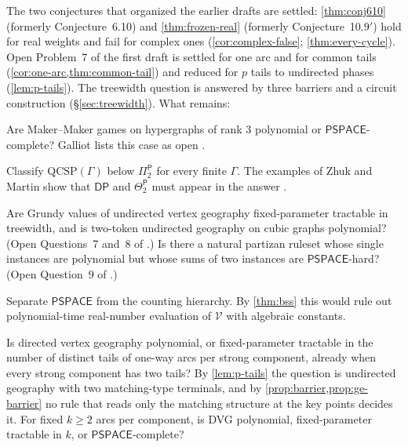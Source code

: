 \documentclass[final]{siamart0516}
\numberwithin{theorem}{section}
\numberwithin{equation}{section}
\theoremstyle{siamnonum}
\theoremstyle{plain}
\newcommand{\val}{\mathcal{V}}            %
\newcommand{\cls}[1]{\mathsf{#1}}
\newcommand{\PSPACE}{\cls{PSPACE}}
\newcommand{\Pclass}{\cls{P}}
\begin{document}
The two conjectures that organized the earlier drafts are settled: \cref{thm:conj610} (formerly Conjecture~6.10) and \cref{thm:frozen-real} (formerly Conjecture~10.9$'$) hold for real weights and fail for complex ones (\cref{cor:complex-false}; \cref{thm:every-cycle}). Open Problem~7 of the first draft is settled for one arc and for common tails (\cref{cor:one-arc,thm:common-tail}) and reduced for $p$ tails to undirected phases (\cref{lem:p-tails}). The treewidth question is answered by three barriers and a circuit construction (\S\ref{sec:treewidth}). What remains:

\begin{problem}\label{prob:makermaker}
Are Maker--Maker games on hypergraphs of rank $3$ polynomial or $\PSPACE$-complete? Galliot lists this case as open \cite{Galliot25}.
\end{problem}

\begin{problem}[below $\Pi_2^{\Pclass}$]\label{prob:qcsp}
Classify $\mathrm{QCSP}(\Gamma)$ below $\Pi_2^{\Pclass}$ for every finite $\Gamma$. The examples of Zhuk and Martin show that $\mathsf{DP}$ and $\Theta_2^{\Pclass}$ must appear in the answer \cite{ZhukMartin}.
\end{problem}

\begin{problem}\label{prob:grundy}
Are Grundy values of undirected vertex geography fixed-parameter tractable in treewidth, and is two-token undirected geography on cubic graphs polynomial? (Open Questions~7 and~8 of \cite{BFT}.) Is there a natural partizan ruleset whose single instances are polynomial but whose sums of two instances are $\PSPACE$-hard? (Open Question~9 of \cite{BFT}.)
\end{problem}

\begin{problem}\label{prob:ch}
Separate $\PSPACE$ from the counting hierarchy. By \cref{thm:bss} this would rule out polynomial-time real-number evaluation of $\val$ with algebraic constants.
\end{problem}

\begin{problem}\label{prob:two-tails}
Is directed vertex geography polynomial, or fixed-parameter tractable in the number of distinct tails of one-way arcs per strong component, already when every strong component has two tails? By \cref{lem:p-tails} the question is undirected geography with two matching-type terminals, and by \cref{prop:barrier,prop:ge-barrier} no rule that reads only the matching structure at the key points decides it. For fixed $k\ge2$ arcs per component, is DVG polynomial, fixed-parameter tractable in $k$, or $\PSPACE$-complete?
\end{problem}
\end{document}

